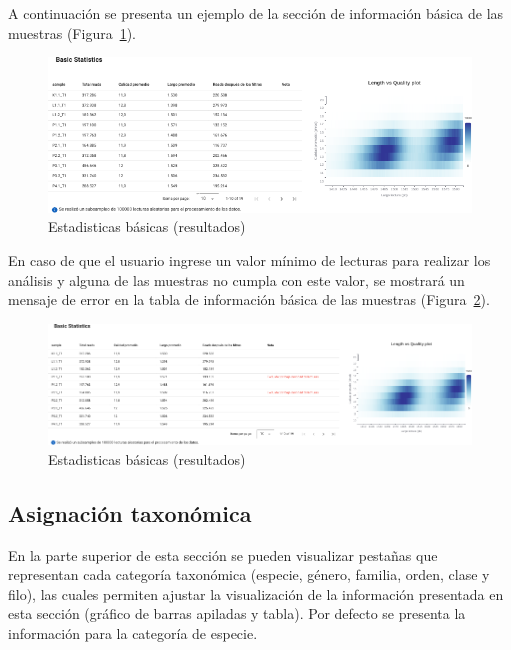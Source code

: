 A continuación se presenta un ejemplo de la sección de información básica de las muestras (Figura~\ref{fig:app-results-basicStatistics}).
\begin{figure}[H]
    \includegraphics[width=1\linewidth]{images/app/results/basicStatistics.pdf}

    \caption{Estadisticas básicas (resultados)}
    \label{fig:app-results-basicStatistics}
\end{figure}

En caso de que el usuario ingrese un valor mínimo de lecturas para realizar los análisis y alguna de las muestras no cumpla con este valor, se mostrará un mensaje de error en la tabla de información básica de las muestras (Figura~\ref{fig:app-results-basicStatistics-exclude}).
\begin{figure}[H]
    \includegraphics[width=1\linewidth]{images/app/results/basicStatistics_exclude.pdf}

    \caption{Estadisticas básicas (resultados)}
    \label{fig:app-results-basicStatistics-exclude}
\end{figure}

\subsection{Asignación taxonómica}
En la parte superior de esta sección se pueden visualizar pestañas que representan cada categoría taxonómica (especie, género, familia, orden, clase y filo), las cuales permiten ajustar la visualización de la información presentada en esta  sección (gráfico de barras apiladas y tabla). Por defecto se presenta la información para la categoría de especie.

